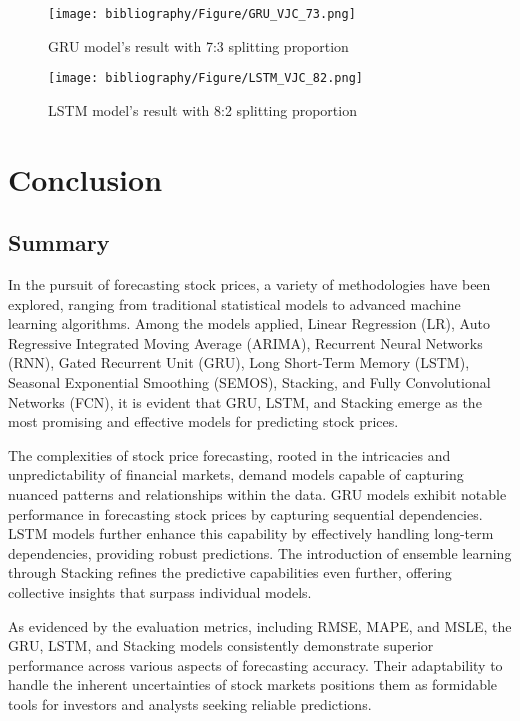 \documentclass{ieeeojies}
\begin{document}
\begin{figure}[H]
  \centering
  \begin{minipage}{0.8\linewidth}
    \centering
    \texttt{[image: bibliography/Figure/GRU\_VJC\_73.png]}
    \caption{GRU model's result with 7:3 splitting proportion}
    \label{fig8}
  \end{minipage}
\end{figure}

\begin{figure}[H]
  \centering
  \begin{minipage}{0.8\linewidth}
    \centering
    \texttt{[image: bibliography/Figure/LSTM\_VJC\_82.png]}
    \caption{LSTM model's result with 8:2 splitting proportion}
    \label{fig9}
  \end{minipage}
\end{figure}


\section{Conclusion}
\subsection{Summary}
In the pursuit of forecasting stock prices, a variety of methodologies have been explored, ranging from traditional statistical models to advanced machine learning algorithms. Among the models applied, Linear Regression (LR), Auto Regressive Integrated Moving Average (ARIMA), Recurrent Neural Networks (RNN), Gated Recurrent Unit (GRU), Long Short-Term Memory (LSTM), Seasonal Exponential Smoothing (SEMOS), Stacking, and Fully Convolutional Networks (FCN), it is evident that GRU, LSTM, and Stacking emerge as the most promising and effective models for predicting stock prices.

The complexities of stock price forecasting, rooted in the intricacies and unpredictability of financial markets, demand models capable of capturing nuanced patterns and relationships within the data. GRU models exhibit notable performance in forecasting stock prices by capturing sequential dependencies. LSTM models further enhance this capability by effectively handling long-term dependencies, providing robust predictions. The introduction of ensemble learning through Stacking refines the predictive capabilities even further, offering collective insights that surpass individual models.

As evidenced by the evaluation metrics, including RMSE, MAPE, and MSLE, the GRU, LSTM, and Stacking models consistently demonstrate superior performance across various aspects of forecasting accuracy. Their adaptability to handle the inherent uncertainties of stock markets positions them as formidable tools for investors and analysts seeking reliable predictions.
\end{document}
